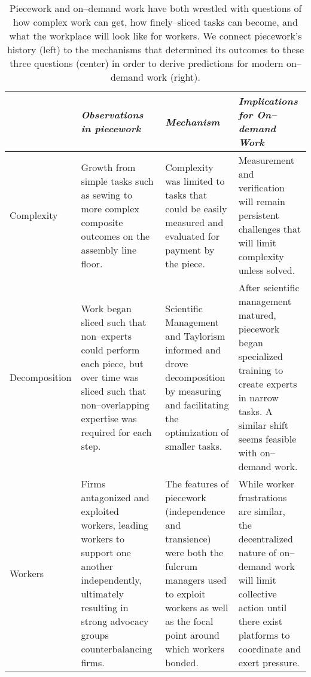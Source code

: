 \documentclass[pn4226]{subfiles}
\begin{document}
\begin{table*}[t]
  \centering
  \begin{tabularx}{\textwidth}{l X X X}
    \toprule
    & \textit{Observations in piecework} & \textit{Mechanism} & \textit{Implications for On--demand Work} \\
    \midrule
    {Complexity} &
    \small{Growth from simple tasks such as sewing to more complex composite outcomes on the assembly line floor.} &
    \small{Complexity was limited to tasks that could be easily measured and evaluated for payment by the piece.} &
    \small{Measurement and verification will remain persistent challenges that will limit complexity unless solved.} \\ \hline

    {Decomposition} &
    \small{Work began sliced such that non--experts could perform each piece, but over time was sliced such that non--overlapping expertise was required for each step.} &
    \small{Scientific Management and Taylorism informed and drove decomposition by measuring and facilitating the optimization of smaller tasks.} &
    \small{After scientific management matured, piecework began  specialized training to create experts in narrow tasks. A similar shift seems feasible with on--demand work.} \\ \hline

    {Workers} &
    \small{Firms antagonized and exploited workers, leading workers to support one another independently, ultimately resulting in strong advocacy groups counterbalancing firms.} &
    \small{The features of piecework (independence and transience) were both the fulcrum managers used to exploit workers as well as the focal point around which workers bonded.} &
    \small{While worker frustrations are similar, the decentralized nature of on--demand work will limit collective action until there exist platforms to coordinate and exert pressure.} \\ 
    \bottomrule
  \end{tabularx}
  \label{tab:overview}
  \caption{Piecework and on--demand work have both wrestled with questions of how complex work can get, how finely--sliced tasks can become, and what the workplace will look like for workers. We connect piecework's history (left) to the mechanisms that determined its outcomes to these three questions (center) in order to derive predictions for modern on--demand work (right). }
\end{table*}
\end{document}
